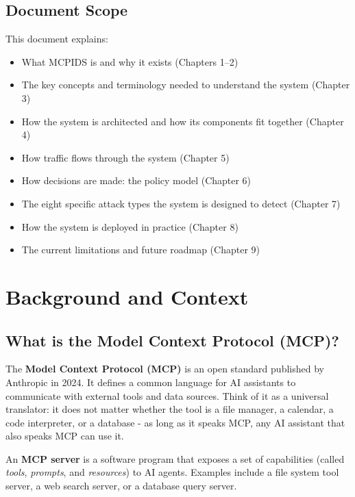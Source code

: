 \documentclass[12pt,a4paper]{report}
\begin{document}
\section{Document Scope}

This document explains:
\begin{itemize}
  \item What MCPIDS is and why it exists (Chapters 1--2)
  \item The key concepts and terminology needed to understand the system (Chapter 3)
  \item How the system is architected and how its components fit together (Chapter 4)
  \item How traffic flows through the system (Chapter 5)
  \item How decisions are made: the policy model (Chapter 6)
  \item The eight specific attack types the system is designed to detect (Chapter 7)
  \item How the system is deployed in practice (Chapter 8)
  \item The current limitations and future roadmap (Chapter 9)
\end{itemize}

\chapter{Background and Context}

\section{What is the Model Context Protocol (MCP)?}

The \textbf{Model Context Protocol (MCP)} is an open standard published by
Anthropic in 2024. It defines a common language for AI assistants to
communicate with external tools and data sources. Think of it as a universal
translator: it does not matter whether the tool is a file manager, a calendar,
a code interpreter, or a database - as long as it speaks MCP, any AI assistant
that also speaks MCP can use it.

\begin{definitionbox}
An \textbf{MCP server} is a software program that exposes a set of capabilities
(called \textit{tools}, \textit{prompts}, and \textit{resources}) to AI agents.
Examples include a file system tool server, a web search server, or a database
query server.
\end{definitionbox}
\end{document}
